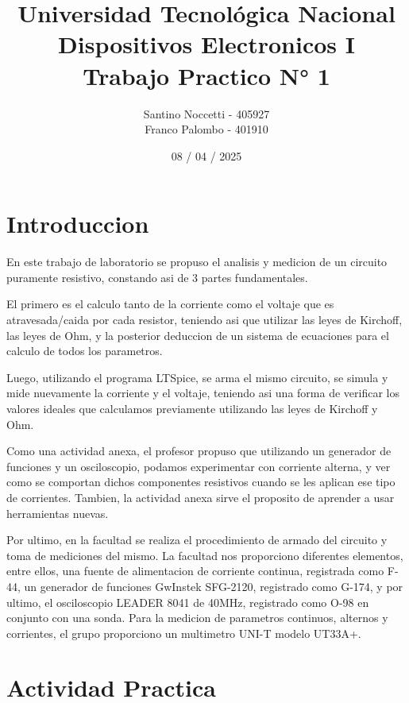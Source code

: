 \documentclass[a4paper,12pt, spanish]{report}
\title{%
\setlength{\headwidth}{\textwidth} %
\setlength{\headheight}{15pt}  %
\setlength{\headsep}{10pt}     %
  \fontsize{25}{0}\selectfont Universidad Tecnológica Nacional \\
  \fontsize{22}{30}\selectfont Dispositivos Electronicos I \\
  \fontsize{20}{25}\selectfont Trabajo Practico N° 1
}
\author{
  Santino Noccetti - 405927\\
  Franco Palombo - 401910\\
}
\date{08 / 04 / 2025}
\newcommand\myemptypage{
  \newpage
  \null
  \thispagestyle{empty}
  \addtocounter{page}{-1}
  \newpage
}
\begin{document}
  \maketitle

  \myemptypage

  \tableofcontents
  \thispagestyle{plain}

  \myemptypage

  \chapter{Introduccion}
    En este trabajo de laboratorio se propuso el analisis y medicion de un circuito puramente resistivo, constando asi de 3
    partes fundamentales.

    El primero es el calculo tanto de la corriente como el voltaje que es atravesada/caida por cada resistor,
    teniendo asi que utilizar las leyes de Kirchoff, las leyes de Ohm, y la posterior deduccion de un sistema de
    ecuaciones para el calculo de todos los parametros.

    Luego, utilizando el programa LTSpice, se arma el mismo circuito, se simula y mide nuevamente la corriente y el
    voltaje, teniendo asi una forma de verificar los valores ideales que calculamos previamente utilizando las leyes
    de Kirchoff y Ohm.

    Como una actividad anexa, el profesor propuso que utilizando un generador de funciones y un osciloscopio, podamos
    experimentar con corriente alterna, y ver como se comportan dichos componentes resistivos cuando se les aplican ese
    tipo de corrientes. Tambien, la actividad anexa sirve el proposito de aprender a usar herramientas nuevas.

    Por ultimo, en la facultad se realiza el procedimiento de armado del circuito y toma de mediciones del mismo.
    La facultad nos proporciono diferentes elementos, entre ellos, una fuente de alimentacion de corriente continua,
    registrada como F-44, un generador de funciones GwInstek SFG-2120, registrado como G-174, y por ultimo, el
    osciloscopio LEADER 8041 de 40MHz, registrado como O-98 en conjunto con una sonda. Para la medicion de parametros
    continuos, alternos y corrientes, el grupo proporciono un multimetro UNI-T modelo UT33A+.

  \myemptypage
  \chapter{Actividad Practica}
\end{document}
